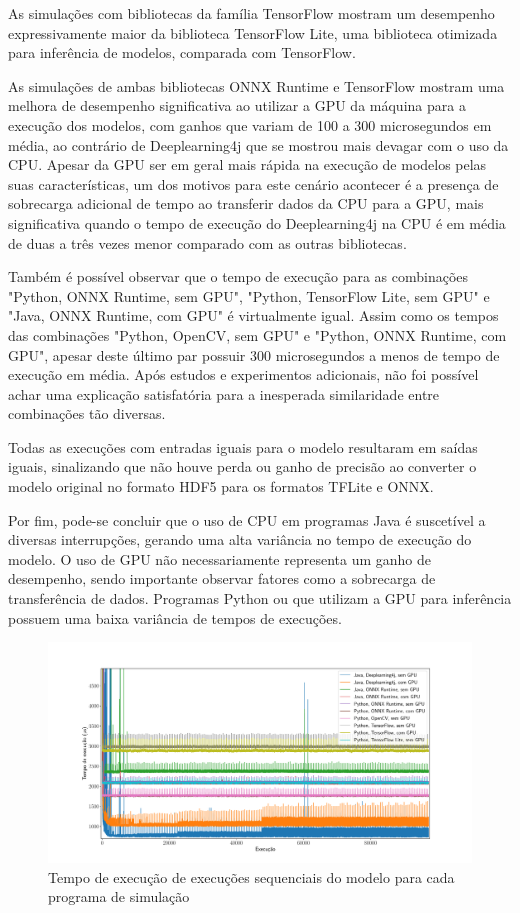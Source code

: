 As simulações com bibliotecas da família TensorFlow mostram um desempenho expressivamente maior da biblioteca TensorFlow Lite, uma biblioteca otimizada para inferência de modelos, comparada com TensorFlow.

As simulações de ambas bibliotecas ONNX Runtime e TensorFlow mostram uma melhora de desempenho significativa ao utilizar a GPU da máquina para a execução dos modelos, com ganhos que variam de 100 a 300 microsegundos em média, ao contrário de Deeplearning4j que se mostrou mais devagar com o uso da CPU. Apesar da GPU ser em geral mais rápida na execução de modelos pelas suas características, um dos motivos para este cenário acontecer é a presença de sobrecarga adicional de tempo ao transferir dados da CPU para a GPU, mais significativa quando o tempo de execução do Deeplearning4j na CPU é em média de duas a três vezes menor comparado com as outras bibliotecas.

Também é possível observar que o tempo de execução para as combinações "Python, ONNX Runtime, sem GPU", "Python, TensorFlow Lite, sem GPU" e "Java, ONNX Runtime, com GPU" é virtualmente igual. Assim como os tempos das combinações "Python, OpenCV, sem GPU" e "Python, ONNX Runtime, com GPU", apesar deste último par possuir 300 microsegundos a menos de tempo de execução em média. Após estudos e experimentos adicionais, não foi possível achar uma explicação satisfatória para a inesperada similaridade entre combinações tão diversas.

Todas as execuções com entradas iguais para o modelo resultaram em saídas iguais, sinalizando que não houve perda ou ganho de precisão ao converter o modelo original no formato HDF5 para os formatos TFLite e ONNX.

Por fim, pode-se concluir que o uso de CPU em programas Java é suscetível a diversas interrupções, gerando uma alta variância no tempo de execução do modelo. O uso de GPU não necessariamente representa um ganho de desempenho, sendo importante observar fatores como a sobrecarga de transferência de dados. Programas Python ou que utilizam a GPU para inferência possuem uma baixa variância de tempos de execuções.

\begin{figure}[h]
  \centerline{\includegraphics[width=\paperwidth]{img/all.pdf}}
  \caption{Tempo de execução de execuções sequenciais do modelo para cada programa de simulação}
  \label{fig:all}
\end{figure}
